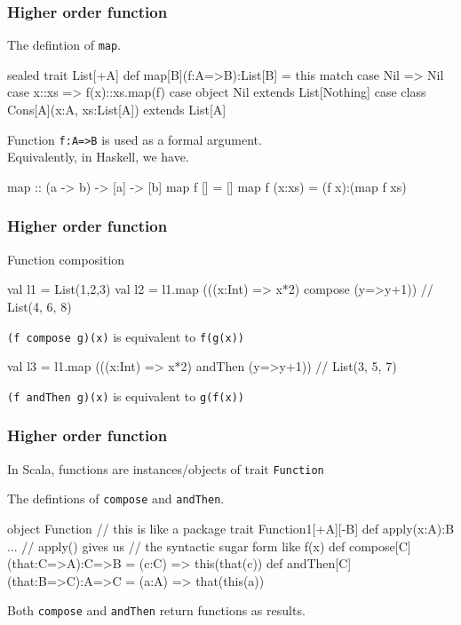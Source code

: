 \documentclass{beamer}
\newcommand{\beb}{\begin{exampleblock}}
\newcommand{\eeb}{\end{exampleblock}}
\begin{document}
\begin{frame}[fragile]
\frametitle{Higher order function}
The defintion of {\tt map}.
\beb{}
\begin{code}
  sealed trait List[+A] {
    def map[B](f:A=>B):List[B] = this match {
      case Nil => Nil
      case x::xs => f(x)::xs.map(f)
    }
  }
  case object Nil extends List[Nothing]
  case class Cons[A](x:A, xs:List[A]) extends List[A]
\end{code}
\eeb
Function {\tt f:A=>B} is used as a formal argument. \\
Equivalently, in Haskell, we have.
\beb{}
\begin{code}
map :: (a -> b) -> [a] -> [b] 
map f [] = [] 
map f (x:xs) = (f x):(map f xs)
\end{code}
\eeb

\end{frame}

\begin{frame}[fragile]
\frametitle{Higher order function}
Function composition
\beb{}
\begin{code}
val l1 = List(1,2,3)
val l2 = l1.map (((x:Int) => x*2) compose (y=>y+1)) 
//  List(4, 6, 8)
\end{code}
\eeb
{\tt (f compose g)(x)} is equivalent to  {\tt f(g(x))}
\beb{}
\begin{code}
val l3 = l1.map (((x:Int) => x*2) andThen (y=>y+1))  
// List(3, 5, 7)
\end{code}
\eeb
{\tt (f andThen g)(x)} is equivalent to  {\tt g(f(x))}

\end{frame}


\begin{frame}[fragile]
\frametitle{Higher order function}
In Scala, functions are instances/objects of trait {\tt Function}
\beb{The defintions of {\tt compose} and {\tt andThen}.}
\begin{code}
object Function { // this is like a package
    trait Function1[+A][-B] {
       def apply(x:A):B {...} 
       // apply() gives us
       // the syntactic sugar form like f(x)
       def compose[C](that:C=>A):C=>B = 
         (c:C) => this(that(c))
       def andThen[C](that:B=>C):A=>C = 
         (a:A) => that(this(a))
    }
}
\end{code}
\eeb
Both {\tt compose} and {\tt andThen} return functions as results.
\end{frame}
\end{document}
